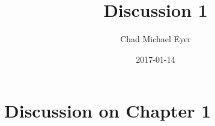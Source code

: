 \documentclass[12pt,apa,article,oneside,strict,titlepage]{eyered}
\author{Chad Michael Eyer}
\title{Discussion 1}
\date{2017-01-14}
\begin{document}

\settitle %


\settitle %

\section{\texorpdfstring{Discussion on Chapter 1
\autocite{decenzo2013fundamental-of-human-resource}}{Discussion on Chapter 1 {[}@decenzo2013fundamental-of-human-resource{]}}}\label{discussion-on-chapter-1-decenzo2013fundamental-of-human-resource}
\end{document}
